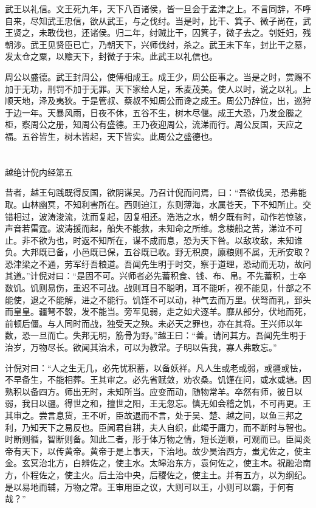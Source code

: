 \documentclass[12pt,UTF8]{ctexbook}
\begin{document}
武王以礼信。文王死九年，天下八百诸侯，皆一旦会于孟津之上。不言同辞，不呼自来，尽知武王忠信，欲从武王，与之伐纣。当是时，比干、箕子、微子尚在，武王贤之，未敢伐也，还诸侯。归二年，纣贼比干，囚箕子，微子去之。刳妊妇，残朝涉。武王见贤臣已亡，乃朝天下，兴师伐纣，杀之。武王未下车，封比干之墓，发太仓之粟，以赡天下，封微子于宋。此武王以礼信也。

周公以盛德。武王封周公，使傅相成王。成王少，周公臣事之。当是之时，赏赐不加于无功，刑罚不加于无罪。天下家给人足，禾麦茂美。使人以时，说之以礼。上顺天地，泽及夷狄。于是管叔、蔡叔不知周公而谗之成王。周公乃辞位，出，巡狩于边一年。天暴风雨，日夜不休，五谷不生，树木尽偃。成王大恐，乃发金縢之柜，察周公之册，知周公有盛德。王乃夜迎周公，流涕而行。周公反国，天应之福。五谷皆生，树木皆起，天下皆实。此周公之盛德也。


\part{}

越绝计倪内经第五

昔者，越王句践既得反国，欲阴谋吴。乃召计倪而问焉，曰：“吾欲伐吴，恐弗能取。山林幽冥，不知利害所在。西则迫江，东则薄海，水属苍天，下不知所止。交错相过，波涛浚流，沈而复起，因复相还。浩浩之水，朝夕既有时，动作若惊骇，声音若雷霆。波涛援而起，船失不能救，未知命之所维。念楼船之苦，涕泣不可止。非不欲为也，时返不知所在，谋不成而息，恐为天下咎。以敌攻敌，未知谁负。大邦既已备，小邑既已保，五谷既已收。野无积庾，廪粮则不属，无所安取？恐津梁之不通，劳军纡吾粮道。吾闻先生明于时交，察于道理，恐动而无功，故问其道。”计倪对曰：“是固不可。兴师者必先蓄积食、钱、布、帛。不先蓄积，士卒数饥。饥则易伤，重迟不可战。战则耳目不聪明，耳不能听，视不能见，什部之不能使，退之不能解，进之不能行。饥馑不可以动，神气去而万里。伏弩而乳，郅头而皇皇。疆弩不彀，发不能当。旁军见弱，走之如犬逐羊。靡从部分，伏地而死，前顿后僵。与人同时而战，独受天之殃。未必天之罪也，亦在其将。王兴师以年数，恐一旦而亡。失邦无明，筋骨为野。”越王曰：“善。请问其方。吾闻先生明于治岁，万物尽长。欲闻其治术，可以为教常。子明以告我，寡人弗敢忘。”

计倪对曰：“人之生无几，必先忧积蓄，以备妖祥。凡人生或老或弱，或疆或怯，不早备生，不能相葬。王其审之。必先省赋敛，劝农桑。饥馑在问，或水或塘。因熟积以备四方。师出无时，未知所当。应变而动，随物常羊。卒然有师，彼日以弱，我日以疆。得世之和，擅世之阳，王无忽忘。慎无如会稽之饥，不可再更。王其审之。尝言息货，王不听，臣故退而不言，处于吴、楚、越之间，以鱼三邦之利，乃知天下之易反也。臣闻君自耕，夫人自织，此竭于庸力，而不断时与智也。时断则循，智断则备。知此二者，形于体万物之情，短长逆顺，可观而已。臣闻炎帝有天下，以传黄帝。黄帝于是上事天，下治地。故少昊治西方，蚩尤佐之，使主金。玄冥治北方，白辨佐之，使主水。太皞治东方，袁何佐之，使主木。祝融治南方，仆程佐之，使主火。后土治中央，后稷佐之，使主土。并有五方，以为纲纪。是以易地而辅，万物之常。王审用臣之议，大则可以王，小则可以霸，于何有哉？”
\end{document}
